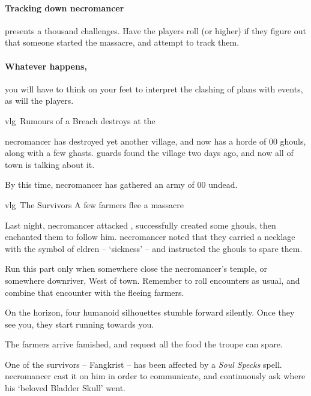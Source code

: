 \paragraph{Tracking down \gls{necromancer}}
presents a thousand challenges.
Have the players roll  (\tn[14] or higher) if they figure out that someone started the massacre, and attempt to track them.

\paragraph{Whatever happens,}
you will have to think on your feet to interpret the clashing of plans with events, as will the players.

{\gls{vlg}~\squash Rumours of a Breach}%
{ destroys  at the }%

\Gls{necromancer} has destroyed yet another \gls{village}, and now has a horde of 00 ghouls, along with a few ghasts.
\Glspl{guard} found the \gls{village} two days ago, and now all of \gls{town} is talking about it.

By this time, \gls{necromancer} has gathered an army of 00 undead.

{\gls{vlg}~The Survivors}%
{A few farmers flee a massacre}%

\begin{exampletext}
  Last night, \gls{necromancer} attacked , successfully created some ghouls, then enchanted them to follow him.
  \Gls{necromancer} noted that they carried a necklage with the symbol of \gls{eldren} -- `\gls{sickness}' -- and instructed the ghouls to spare them.
\end{exampletext}

Run this part only when somewhere close the \gls{necromancer}'s temple, or somewhere downriver, West of \gls{town}.
Remember to roll encounters as usual, and combine that encounter with the fleeing farmers.

\begin{boxtext}
  On the horizon, four humanoid silhouettes stumble forward silently.
  Once they see you, they start running towards you.
\end{boxtext}

The farmers arrive famished, and request all the food the troupe can spare.

One of the survivors -- Fangkrist -- has been affected by a \textit{Soul Specks} spell.
\Gls{necromancer} cast it on him in order to communicate, and continuously ask where his `beloved Bladder Skull' went.

